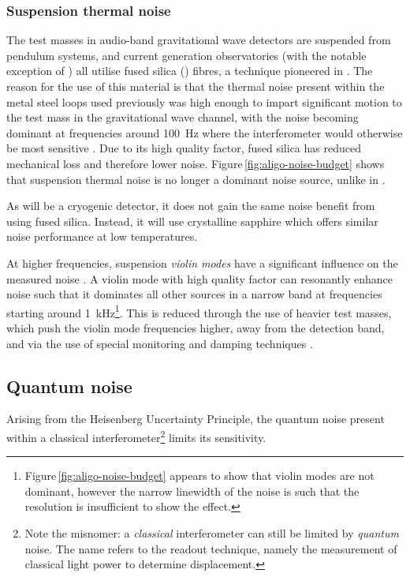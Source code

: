 \subsubsection{\label{sec:sus-thermal-noise}Suspension thermal noise}
The test masses in audio-band gravitational wave detectors are suspended from pendulum systems, and current generation observatories (with the notable exception of \KAGRA{}) all utilise fused silica () fibres, a technique pioneered in \GEO{}. The reason for the use of this material is that the thermal noise present within the metal steel loops used previously was high enough to impart significant motion to the test mass in the gravitational wave channel, with the noise becoming dominant at frequencies around \SI{100}{\hertz} where the interferometer would otherwise be most sensitive \cite{Hammond2012}. Due to its high quality factor, fused silica has reduced mechanical loss and therefore lower noise. Figure\,\ref{fig:aligo-noise-budget} shows that suspension thermal noise is no longer a dominant noise source, unlike in \ILIGO{} .

As \KAGRA{} will be a cryogenic detector, it does not gain the same noise benefit from using fused silica. Instead, it will use crystalline sapphire which offers similar noise performance at low temperatures.

At higher frequencies, suspension \emph{violin modes} have a significant influence on the measured noise \cite{Robertson2002}. A violin mode with high quality factor can resonantly enhance noise such that it dominates all other sources in a narrow band at frequencies starting around \SI{1}{\kilo\hertz}\footnote{Figure\,\ref{fig:aligo-noise-budget} appears to show that violin modes are not dominant, however the narrow linewidth of the noise is such that the resolution is insufficient to show the effect.}. This is reduced through the use of heavier test masses, which push the violin mode frequencies higher, away from the detection band, and via the use of special monitoring and damping techniques \cite{Sorazu2010} .

\subsection{Quantum noise}
Arising from the Heisenberg Uncertainty Principle, the quantum noise present within a classical interferometer\footnote{Note the misnomer: a \emph{classical} interferometer can still be limited by \emph{quantum} noise. The name refers to the readout technique, namely the measurement of classical light power to determine displacement.} limits its sensitivity.

